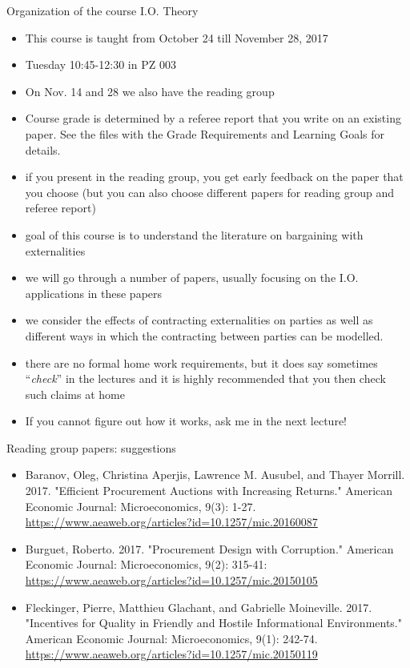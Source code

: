 \documentclass[11pt,english]{beamer}
\begin{document}
\begin{frame}[allowframebreaks]{Organization of the course I.O. Theory}
  \begin{itemize}
  \item This course is taught from October 24 till November 28, 2017
  \item Tuesday 10:45-12:30 in PZ 003
  \item On Nov. 14 and 28 we also have the reading group
  \item Course grade is determined by a referee report that you write
    on an existing paper. See the files with the Grade Requirements
    and Learning Goals for details.
  \item if you present in the reading group, you get early feedback on the paper
    that you choose (but you can also choose different papers for reading group and referee report)
  \item goal of this course is to understand the literature on
    bargaining with externalities
  \item we will go through a number of papers, usually focusing on the
    I.O. applications in these papers
  \item we consider the effects of contracting externalities on
    parties as well as different ways in which the contracting between
    parties can be modelled.
  \item there are no formal home work requirements, but it does say
    sometimes ``\emph{check}'' in the lectures and it is highly recommended
    that you then check such claims at home
  \item If you cannot figure out how it works, ask me in the next
    lecture!
  \end{itemize}
\end{frame}

\begin{frame}{Reading group papers: suggestions}
  \begin{itemize}

  \item Baranov, Oleg, Christina Aperjis, Lawrence M. Ausubel, and Thayer Morrill. 2017. "Efficient Procurement Auctions with Increasing Returns." American Economic Journal: Microeconomics, 9(3): 1-27. \url{https://www.aeaweb.org/articles?id=10.1257/mic.20160087}
  \item Burguet, Roberto. 2017. "Procurement Design with Corruption." American Economic Journal: Microeconomics, 9(2): 315-41: \url{https://www.aeaweb.org/articles?id=10.1257/mic.20150105}
  \item Fleckinger, Pierre, Matthieu Glachant, and Gabrielle Moineville. 2017. "Incentives for Quality in Friendly and Hostile Informational Environments." American Economic Journal: Microeconomics, 9(1): 242-74. \url{https://www.aeaweb.org/articles?id=10.1257/mic.20150119}
  \end{itemize}
\end{frame}
\end{document}
